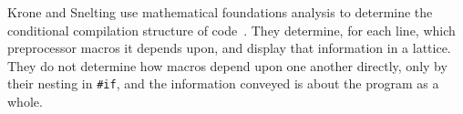 \documentclass[11pt]{article}
\begin{document}

Krone and Snelting use mathematical foundations analysis to determine the
conditional compilation structure of code~\cite{Krone94}.  They determine,
for each line, which preprocessor macros it depends upon, and display that
information in a lattice.  They do not determine how macros depend upon one
another directly, only by their nesting in {\tt \#if}, and the information
conveyed is about the program as a whole.



{\small }
\end{document}
